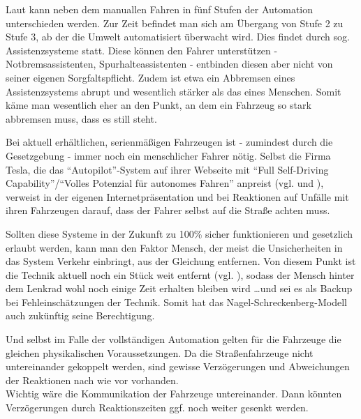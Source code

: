 Laut \cite{automation-level} kann neben dem manuallen Fahren in fünf Stufen der Automation unterschieden werden.
Zur Zeit befindet man sich am Übergang von Stufe 2 zu Stufe 3, ab der die Umwelt automatisiert überwacht wird.
Dies findet durch sog. Assistenzsysteme statt.
Diese können den Fahrer unterstützen - Notbremsassistenten, Spurhalteassistenten - entbinden diesen aber nicht von seiner eigenen Sorgfaltspflicht.
Zudem ist etwa ein Abbremsen eines Assistenzsystems abrupt und wesentlich stärker als das eines Menschen.
Somit käme man wesentlich eher an den Punkt, an dem ein Fahrzeug so stark abbremsen muss, dass es still steht.

Bei aktuell erhältlichen, serienmäßigen Fahrzeugen ist - zumindest durch die Gesetzgebung - immer noch ein menschlicher Fahrer nötig.
Selbst die Firma Tesla, die das \enquote{Autopilot}-System auf ihrer Webseite mit \enquote{Full Self-Driving Capability}/\enquote{Volles Potenzial für autonomes Fahren} anpreist (vgl. \cite{tesla-en} und \cite{tesla-de}), verweist in der eigenen Internetpräsentation und bei Reaktionen auf Unfälle mit ihren Fahrzeugen darauf, dass der Fahrer selbst auf die Straße achten muss. \cite{firetruck-accident}

Sollten diese Systeme in der Zukunft zu 100\% sicher funktionieren und gesetzlich erlaubt werden, kann man den Faktor Mensch, der meist die Unsicherheiten in das System Verkehr einbringt, aus der Gleichung entfernen.
Von diesem Punkt ist die Technik aktuell noch ein Stück weit entfernt (vgl. \cite{how-far-is-autonomous-driving}), sodass der Mensch hinter dem Lenkrad wohl noch einige Zeit erhalten bleiben wird \ldots und sei es als Backup bei Fehleinschätzungen der Technik.
Somit hat das Nagel-Schreckenberg-Modell auch zukünftig seine Berechtigung.

Und selbst im Falle der vollständigen Automation gelten für die Fahrzeuge die gleichen physikalischen Voraussetzungen.
Da die Straßenfahrzeuge nicht untereinander gekoppelt werden, sind gewisse Verzögerungen und Abweichungen der Reaktionen nach wie vor vorhanden.
\\
Wichtig wäre die Kommunikation der Fahrzeuge untereinander.
Dann könnten Verzögerungen durch Reaktionszeiten ggf. noch weiter gesenkt werden.
